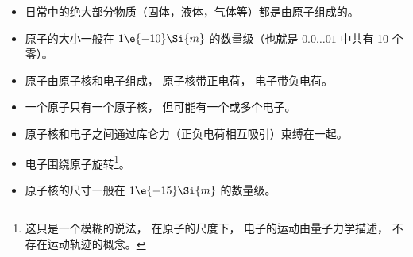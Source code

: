 
\begin{issues}
\issueDraft
\end{issues}

\begin{itemize}
\item 日常中的绝大部分物质（固体，液体，气体等）都是由原子组成的。
\item 原子的大小一般在 $1\e{-10}\Si{m}$ 的数量级（也就是 $0.0\dots01$ 中共有 10 个零）。
\item 原子由原子核和电子组成， 原子核带正电荷， 电子带负电荷。
\item 一个原子只有一个原子核， 但可能有一个或多个电子。
\item 原子核和电子之间通过库仑力（正负电荷相互吸引）束缚在一起。
\item 电子围绕原子旋转\footnote{这只是一个模糊的说法， 在原子的尺度下， 电子的运动由量子力学描述， 不存在运动轨迹的概念。}。

\item 原子核的尺寸一般在 $1\e{-15}\Si{m}$ 的数量级。
\end{itemize}
